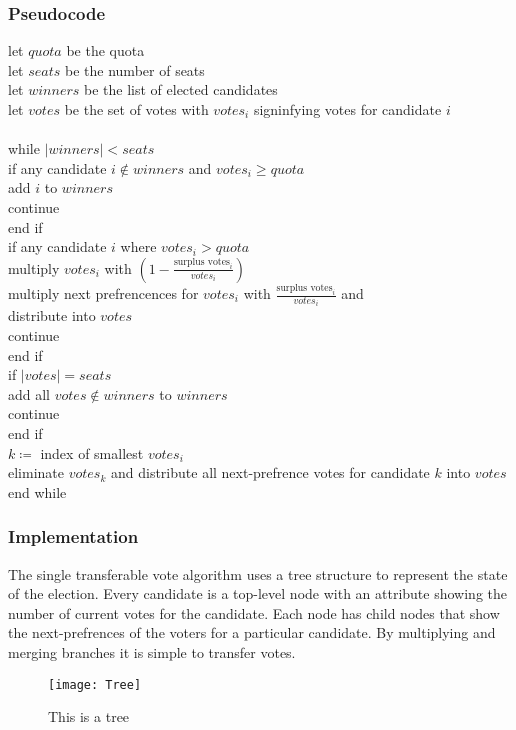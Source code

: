 \subsubsection{Pseudocode}
let $quota$ be the quota \\
let $seats$ be the number of seats \\
let $winners$ be the list of elected candidates \\
let $votes$ be the set of votes with $votes_{i}$ signinfying votes for candidate $i$\\\\
while $\left\vert{winners}\right\vert < seats$\\
\tab if any candidate $i \notin winners$ and $votes_{i} \geq quota$ \\
\tab\tab add $i$ to $winners$ \\
\tab\tab continue \\
\tab end if \\
\tab if any candidate $i$ where $votes_{i} > quota$\\
\tab\tab multiply $votes_{i}$ with $(1 - \frac{\text{surplus votes}_{i}}{votes_{i}})$ \\
\tab\tab multiply next prefrencences for $votes_{i}$ with $\frac{\text{surplus votes}_{i}}{votes_{i}}$ and \\ \tab\tab distribute into $votes$\\
\tab\tab continue \\
\tab end if \\
\tab if $\left\vert{votes}\right\vert = seats$ \\
\tab\tab add all $votes \notin winners$ to $winners$ \\
\tab\tab continue \\
\tab end if \\
\tab $k \coloneqq$ index of smallest $votes_{i}$ \\
\tab eliminate $votes_{k}$ and distribute all next-prefrence votes for candidate $k$ \tab into $votes$\\
end while
\subsubsection{Implementation}
The single transferable vote algorithm uses a tree structure to represent the state of the election. Every candidate is a top-level node with an attribute showing the number of current votes for the candidate. Each node has child nodes that show the next-prefrences of the voters for a particular candidate. By multiplying and merging branches it is simple to transfer votes.
\begin{figure}
	\centering
	\texttt{[image: Tree]}
	\caption{This is a tree}
	\label{Tree structure}
\end{figure}

